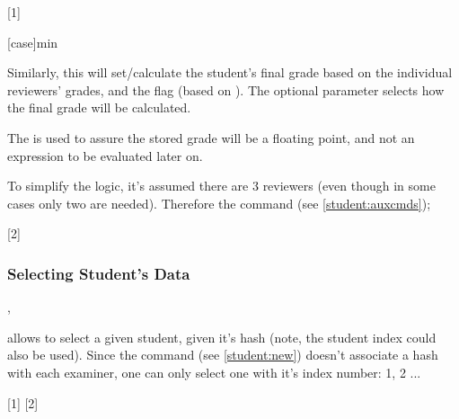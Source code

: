 \documentclass[10pt]{article}
\begin{document}
[1]



\begin{codedescribe}{\studentgrade}
\begin{codesyntax}
  \tsmacro{\studentgrade}[case]{min}
\end{codesyntax}  
Similarly, this will set/calculate the student's final grade based on the individual reviewers' grades, and the flag  (based on ).  The optional parameter  selects how the final grade will be calculated.
\begin{tsremark}
  The  is used to assure the stored grade will be a floating point, and not an expression to be evaluated later on.
\end{tsremark}
\begin{tsremark}
  To simplify the logic, it's assumed there are 3 reviewers (even though in some cases only two are needed). Therefore the command \tsobj{\emptytermifnone} (see \ref{student:auxcmds});
\end{tsremark}
\end{codedescribe}

[2]


\subsubsection{Selecting Student's Data}\label{student:data-recovery}

\begin{codedescribe}{\studentselect,\studentReviewerSelect}
\begin{codesyntax}
\end{codesyntax}
 \tsobj{\studentselect} allows to select a given student, given it's hash (note, the student index could also be used). Since the \tsobj{\examiner} command (see \ref{student:new}) doesn't associate a hash with each examiner, one can only select one with it's index number: 1, 2 ...
\end{codedescribe}

[1]
[2]
\end{document}

